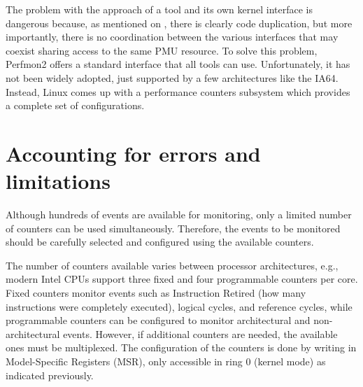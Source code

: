 The problem with the approach of a tool and its own kernel interface is dangerous because, as mentioned on \cite{Eranian2008Perfmon2}, there is clearly code duplication, but more importantly, there is no coordination between the various interfaces that may coexist sharing access to the same PMU resource. To solve this problem, Perfmon2 \cite{Eranian2008Perfmon2} offers a standard interface that all tools can use. Unfortunately, it has not been widely adopted, just supported by a few architectures like the IA64. Instead, Linux comes up with a performance counters subsystem which provides a complete set of configurations.


\section{Accounting for errors and limitations} \label{sec:accounting_for_errors_and_limitations}

Although hundreds of events are available for monitoring, only a limited number of counters can be used simultaneously.
Therefore, the events to be monitored should be carefully selected and configured using the available counters.

The number of counters available varies between processor architectures, e.g., modern Intel CPUs \cite{Intel2013IntelGuide} support three fixed and four programmable counters per core. Fixed counters monitor events such as Instruction Retired (how many instructions were completely executed), logical cycles, and reference cycles, while programmable counters can be configured to monitor architectural and non-architectural events. 
However, if additional counters are needed, the available ones must be multiplexed.
The configuration of the counters is done by writing in Model-Specific Registers (MSR), only accessible in ring 0 (kernel mode) as indicated previously. 



